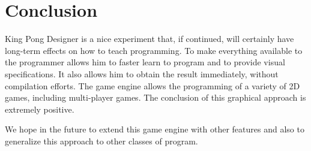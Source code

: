 \documentclass[12pt]{article} %
\begin{document}
\section{Conclusion}
King Pong Designer is a nice experiment that, if continued, will certainly have
long-term effects on how to teach programming.
To make everything available to the programmer allows him to faster learn
to program and to provide visual specifications. It also allows him to
obtain the result immediately, without compilation efforts.
The game engine allows the programming of a variety of 2D games, including
multi-player games. The conclusion of this graphical approach is extremely
positive.

We hope in the future to extend this game engine with other features and also
to generalize this approach to other classes of program.


\end{document}
